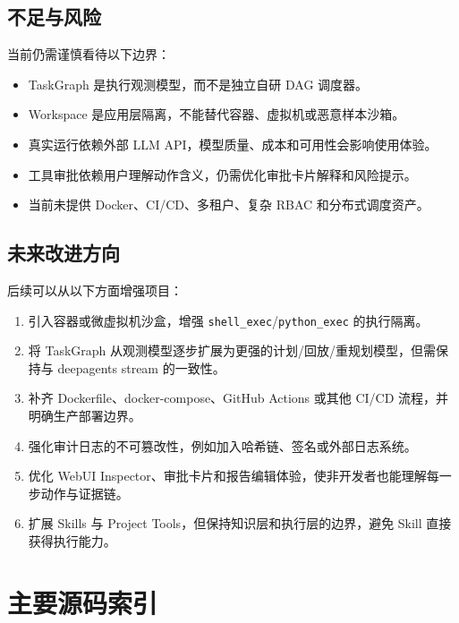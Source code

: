 \documentclass[UTF8,zihao=-4,a4paper,fontset=none]{ctexart}
\newcommand{\code}[1]{\texttt{\footnotesize #1}}
\begin{document}
\subsection{不足与风险}

当前仍需谨慎看待以下边界：

\begin{itemize}
  \item TaskGraph 是执行观测模型，而不是独立自研 DAG 调度器。
  \item Workspace 是应用层隔离，不能替代容器、虚拟机或恶意样本沙箱。
  \item 真实运行依赖外部 LLM API，模型质量、成本和可用性会影响使用体验。
  \item 工具审批依赖用户理解动作含义，仍需优化审批卡片解释和风险提示。
  \item 当前未提供 Docker、CI/CD、多租户、复杂 RBAC 和分布式调度资产。
\end{itemize}

\subsection{未来改进方向}

后续可以从以下方面增强项目：

\begin{enumerate}
  \item 引入容器或微虚拟机沙盒，增强 \code{shell\_exec}/\code{python\_exec} 的执行隔离。
  \item 将 TaskGraph 从观测模型逐步扩展为更强的计划/回放/重规划模型，但需保持与 deepagents stream 的一致性。
  \item 补齐 Dockerfile、docker-compose、GitHub Actions 或其他 CI/CD 流程，并明确生产部署边界。
  \item 强化审计日志的不可篡改性，例如加入哈希链、签名或外部日志系统。
  \item 优化 WebUI Inspector、审批卡片和报告编辑体验，使非开发者也能理解每一步动作与证据链。
  \item 扩展 Skills 与 Project Tools，但保持知识层和执行层的边界，避免 Skill 直接获得执行能力。
\end{enumerate}

\appendix
\section{主要源码索引}
\end{document}
